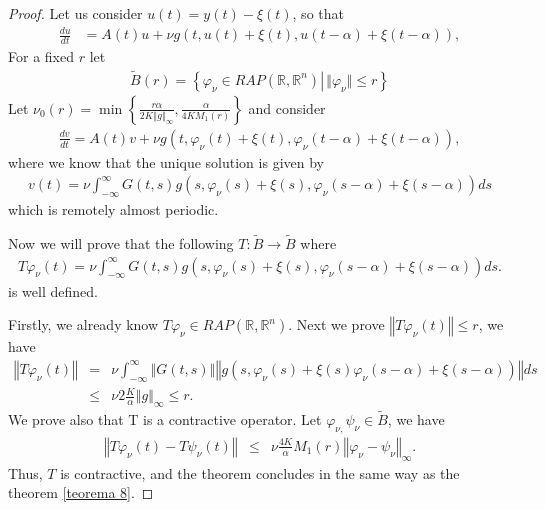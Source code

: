 \documentclass[english,reqno]{amsart}
\numberwithin{equation}{section}
\theoremstyle{plain}
\theoremstyle{definition}
\theoremstyle{remark}
\begin{document}
\begin{proof}
Let us consider $u\left(t\right)=y\left(t\right)-\xi\left(t\right)$, so that
\begin{align*}
\frac{du}{dt} & =A\left(t\right)u+\nu g\left(t,u\left(t\right)+\xi\left(t\right),u\left(t-\alpha\right)+\xi\left(t-\alpha\right)\right),
\end{align*}
For a fixed $r$ let 
\begin{eqnarray*}
\tilde{B}(r)=\left\{ \varphi_{\nu}\in RAP(\mathbb{R},\mathbb{R}^{n})\left|\,\Vert\varphi_{\nu}\Vert\leq r\right.\right\} 
\end{eqnarray*}
Let $\nu_{0}(r)=\min\left\{ \frac{r\alpha}{2K\left\Vert g\right\Vert _{\infty}},\frac{\alpha}{4KM_{1}(r)}\right\}$
and consider
\begin{eqnarray*}
\frac{dv}{dt}=A\left(t\right)v+\nu g\left(t,\varphi_{\nu}\left(t\right)+\xi\left(t\right),\varphi_{\nu}\left(t-\alpha\right)+\xi\left(t-\alpha\right)\right),
\end{eqnarray*}
where we know that the unique solution is given by
\begin{eqnarray*}
v(t)=\nu\int_{-\infty}^{\infty}G(t,s)g\left(s,\varphi_{\nu}\left(s\right)+\xi\left(s\right),\varphi_{\nu}\left(s-\alpha\right)+\xi\left(s-\alpha\right)\right)ds
\end{eqnarray*}
which is remotely almost periodic.

Now we will prove that the following $T:\tilde{B}\rightarrow\tilde{B}$ where
\begin{eqnarray*}
T\varphi_{\nu}(t)=\nu\int_{-\infty}^{\infty}G(t,s)g\left(s,\varphi_{\nu}\left(s\right)+\xi\left(s\right),\varphi_{\nu}\left(s-\alpha\right)+\xi\left(s-\alpha\right)\right)ds.
\end{eqnarray*}
is well defined.

Firstly, we already know $T\varphi_{\nu}\in RAP(\mathbb{R},\mathbb{R}^{n})$. Next we prove $\left\Vert T\varphi_{\nu}(t)\right\Vert \leq r$, we have
\begin{eqnarray*}
\left\Vert T\varphi_{\nu}(t)\right\Vert 	
&=&	\nu\int_{-\infty}^{\infty}\left\Vert G(t,s)\right\Vert \left\Vert g\left(s,\varphi_{\nu}\left(s\right)+\xi\left(s\right)\varphi_{\nu}\left(s-\alpha\right)+\xi\left(s-\alpha\right)\right)\right\Vert ds\\
	&\leq&	\nu2\frac{K}{\alpha}\left\Vert g\right\Vert _{\infty}\leq r.
\end{eqnarray*}
We prove also that T is a contractive operator. Let $\varphi_{\nu,}\psi_{\nu}\in\tilde{B}$, we have
\begin{eqnarray*}
\left\Vert T\varphi_{\nu}(t)-T\psi_{\nu}(t)\right\Vert 	
	&\leq&	\nu\frac{4K}{\alpha}M_{1}(r)\left\Vert \varphi_{\nu}-\psi_{\nu}\right\Vert _{\infty}.
\end{eqnarray*}
Thus, $T$ is contractive, and the theorem concludes in the same way as the theorem \ref{teorema 8}.
\end{proof}
\end{document}
